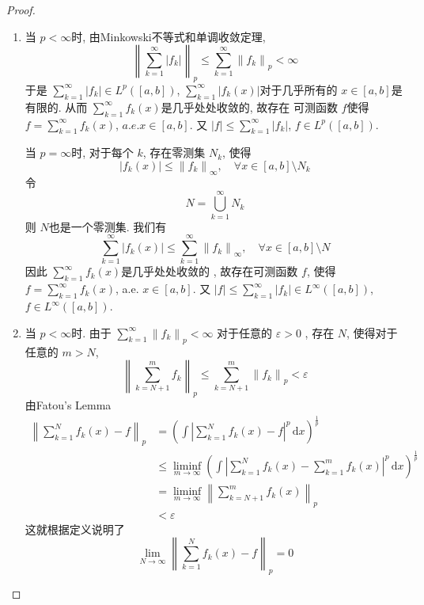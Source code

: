 \documentclass[../main.tex]{subfiles}
\begin{document}
\begin{proof}
  \begin{enumerate}
    \item 当 \(  p< \infty  \)时, 由Minkowski不等式和单调收敛定理, \[
   \left\|  \sum _{k= 1}^{\infty}\left| f_{k}  \right| \right\| _{p}\le \sum _{k= 1}^{\infty}\left\| f_{k} \right\|_{p}< \infty
    \]于是 \(  \sum _{k= 1}^{\infty}\left| f_{k} \right|\in L^{p}\left( \left[ a,b \right]  \right)    \),  \(  \sum _{k= 1}^{\infty}\left| f_{k}\left( x \right)  \right|   \)对于几乎所有的 \(  x\in \left[ a,b \right]   \)是有限的. 从而 \(  \sum _{k= 1}^{\infty}f_{k}\left( x \right)   \)是几乎处处收敛的, 故存在 可测函数 \(  f  \)使得 \(  f= \sum _{k= 1}^{\infty}f_{k}\left( x \right)   \), \(  a.e.x\in \left[ a,b \right]   \). 又 \(  \left| f \right|\le  \sum _{k= 1}^{\infty}\left| f_{k} \right|   \), \(  f\in L^{p}\left( \left[ a,b \right]  \right)   \).

    当 \(  p= \infty  \)时,  对于每个 \(  k  \), 存在零测集 \(  N_{k}  \), 使得 \[
    \left| f_{k}\left( x \right)  \right|\le \left\| f_{k} \right\|_{\infty},\quad \forall x\in [a,b]\setminus N_{k} 
    \]  令 \[
    N= \bigcup _{k= 1}^{\infty}N_{k}
    \]则 \(  N  \)也是一个零测集. 我们有 \[
    \sum _{k= 1}^{\infty}\left| f_{k}\left( x \right)  \right| \le \sum _{k= 1}^{\infty}\left\| f_{k} \right\|_{\infty},\quad \forall x\in [a,b]\setminus N
    \] 因此 \(  \sum _{k= 1}^{\infty}f_{k}\left( x \right)   \)是几乎处处收敛的 , 故存在可测函数 \(  f  \), 使得 \(  f= \sum _{k= 1}^{\infty}f_{k}\left( x \right)   \), a.e. \(  x\in \left[ a,b \right]   \). 又 \(  \left| f \right|\le \sum _{k= 1}^{\infty}\left| f_{k} \right|    \in L^{\infty}\left( [a,b] \right) \), \(  f\in L^{\infty}\left( \left[ a,b \right]  \right)   \).     
    \item     当 \(  p< \infty  \)时.  由于 \(  \sum _{k= 1}^{\infty}\left\| f_{k} \right\|_{p}< \infty  \) 对于任意的 \(   \varepsilon > 0  \) , 存在 \(  N  \), 使得对于任意的 \(  m>  N  \),   \[
    \left\| \sum _{k= N+ 1}^{m}f_{k}  \right\|_{p} \le \sum _{k= N+ 1}^{m}\left\| f_{k} \right\|_{p}<  \varepsilon 
    \]  由Fatou's Lemma \[
 \begin{aligned}
   \left\| \sum _{k= 1}^{N}f_{k}\left( x \right)-f  \right\|_{p}&=\left(  \int \left| \sum _{k= 1}^{N}f_{k}\left( x \right)-f  \right|^{p}\,\mathrm{d} x \right)^{\frac{1}{p}}   \\ 
    &\le \liminf_{m\to \infty}\left( \int \left| \sum _{k = 1}^{N}f_{k}\left( x \right)-\sum _{k = 1}^{m}f_{k}\left( x \right)  \right|^{p}\,\mathrm{d} x  \right)^{\frac{1}{p}}\\ 
     &= \liminf_{m\to \infty}\left\| \sum _{k= N+ 1}^{m}f_{k}\left( x \right)  \right\|_{p}\\ 
      &<  \varepsilon  
 \end{aligned}
    \]这就根据定义说明了 \[
    \lim_{N\to \infty}\left\| \sum _{k= 1}^{N}f_{k}\left( x \right)-f  \right\|_{p}= 0
    \] 


\end{enumerate}
\end{proof}
\end{document}
